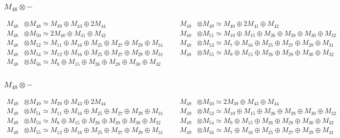 \subsubsection{$ M_{48}\otimes -$}
\begin{align*}
M_{48} &\otimes M_{48} \simeq M_{39} \oplus M_{43} \oplus 2M_{44} &&& M_{48} &\otimes M_{49} \simeq M_{40} \oplus 2M_{41} \oplus M_{42}\\
M_{48} &\otimes M_{50} \simeq 2M_{40} \oplus M_{41} \oplus M_{42} &&& M_{48} &\otimes M_{51} \simeq M_{10} \oplus M_{15} \oplus M_{26} \oplus M_{28} \oplus M_{30} \oplus M_{32}\\
M_{48} &\otimes M_{52} \simeq M_{11} \oplus M_{16} \oplus M_{25} \oplus M_{27} \oplus M_{29} \oplus M_{31} &&& M_{48} &\otimes M_{53} \simeq M_{7} \oplus M_{16} \oplus M_{25} \oplus M_{27} \oplus M_{29} \oplus M_{31}\\
M_{48} &\otimes M_{54} \simeq M_{12} \oplus M_{16} \oplus M_{25} \oplus M_{27} \oplus M_{29} \oplus M_{31} &&& M_{48} &\otimes M_{55} \simeq M_{9} \oplus M_{15} \oplus M_{26} \oplus M_{28} \oplus M_{30} \oplus M_{32}\\
M_{48} &\otimes M_{56} \simeq M_{8} \oplus M_{15} \oplus M_{26} \oplus M_{28} \oplus M_{30} \oplus M_{32}
\end{align*}

\subsubsection{$ M_{49}\otimes -$}
\begin{align*}
M_{49} &\otimes M_{49} \simeq M_{39} \oplus M_{43} \oplus 2M_{44} &&& M_{49} &\otimes M_{50} \simeq 2M_{39} \oplus M_{43} \oplus M_{44}\\
M_{49} &\otimes M_{51} \simeq M_{11} \oplus M_{16} \oplus M_{25} \oplus M_{27} \oplus M_{29} \oplus M_{31} &&& M_{49} &\otimes M_{52} \simeq M_{10} \oplus M_{15} \oplus M_{26} \oplus M_{28} \oplus M_{30} \oplus M_{32}\\
M_{49} &\otimes M_{53} \simeq M_{8} \oplus M_{15} \oplus M_{26} \oplus M_{28} \oplus M_{30} \oplus M_{32} &&& M_{49} &\otimes M_{54} \simeq M_{9} \oplus M_{15} \oplus M_{26} \oplus M_{28} \oplus M_{30} \oplus M_{32}\\
M_{49} &\otimes M_{55} \simeq M_{12} \oplus M_{16} \oplus M_{25} \oplus M_{27} \oplus M_{29} \oplus M_{31} &&& M_{49} &\otimes M_{56} \simeq M_{7} \oplus M_{16} \oplus M_{25} \oplus M_{27} \oplus M_{29} \oplus M_{31}\\
\end{align*}

